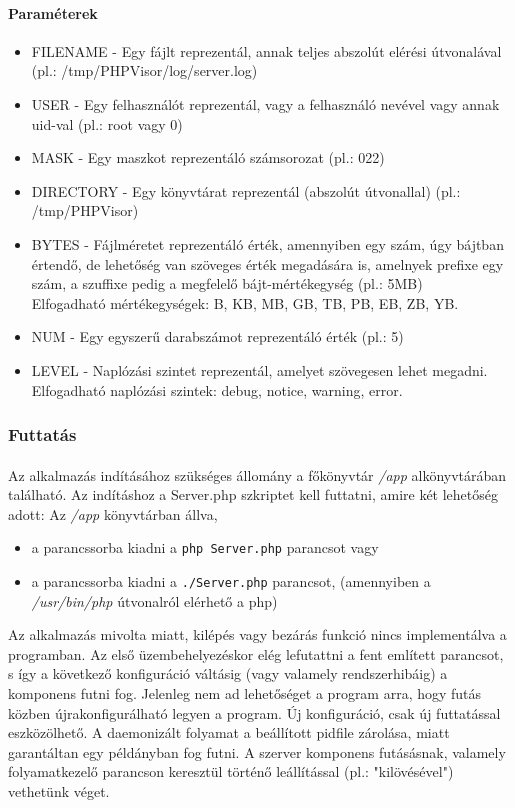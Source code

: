 \documentclass[12pt]{report}
\begin{document}
  \paragraph{Paraméterek}
  \begin{itemize}
  \item FILENAME - Egy fájlt reprezentál, annak teljes abszolút elérési útvonalával (pl.: /tmp/PHPVisor/log/server.log)
  \item USER - Egy felhasználót reprezentál, vagy a felhasználó nevével vagy annak uid-val (pl.: root vagy 0)
  \item MASK - Egy maszkot reprezentáló számsorozat (pl.: 022)
  \item DIRECTORY - Egy könyvtárat reprezentál (abszolút útvonallal) (pl.: /tmp/PHPVisor)
  \item BYTES - Fájlméretet reprezentáló érték, amennyiben egy szám, úgy bájtban értendő, de lehetőség van szöveges érték megadására is, amelnyek prefixe egy szám, a szuffixe pedig a megfelelő bájt-mértékegység (pl.: 5MB) \\  Elfogadható mértékegységek: B, KB, MB, GB, TB, PB, EB, ZB, YB.
  \item NUM - Egy egyszerű darabszámot reprezentáló érték (pl.: 5)
  \item LEVEL - Naplózási szintet reprezentál, amelyet szövegesen lehet megadni. \\
  Elfogadható naplózási szintek: debug, notice, warning, error.
  \end{itemize}
  
  \subsubsection{Futtatás}
  \paragraph{}
  Az alkalmazás indításához szükséges állomány a főkönyvtár \textit{/app} alkönyvtárában található. Az indításhoz a  Server.php szkriptet kell futtatni, amire két lehetőség adott: Az \textit{/app} könyvtárban állva,
  \begin{itemize}
  \item a parancssorba kiadni a \verb|php Server.php| parancsot vagy
  \item a parancssorba kiadni a \verb|./Server.php| parancsot, (amennyiben a \textit{/usr/bin/php} útvonalról elérhető a php)
  \end{itemize}
  Az alkalmazás mivolta miatt, kilépés vagy bezárás funkció nincs implementálva a programban. Az első üzembehelyezéskor elég lefutattni a fent említett parancsot, s így a következő konfiguráció váltásig (vagy valamely rendszerhibáig) a komponens futni fog. Jelenleg nem ad lehetőséget a program arra, hogy futás közben újrakonfigurálható legyen a program. Új konfiguráció, csak új futtatással eszközölhető. A daemonizált folyamat a beállított pidfile zárolása, miatt garantáltan egy példányban fog futni. A szerver komponens futásásnak, valamely folyamatkezelő parancson keresztül történő leállítással (pl.: "kilövésével") vethetünk véget.
  
\end{document}
